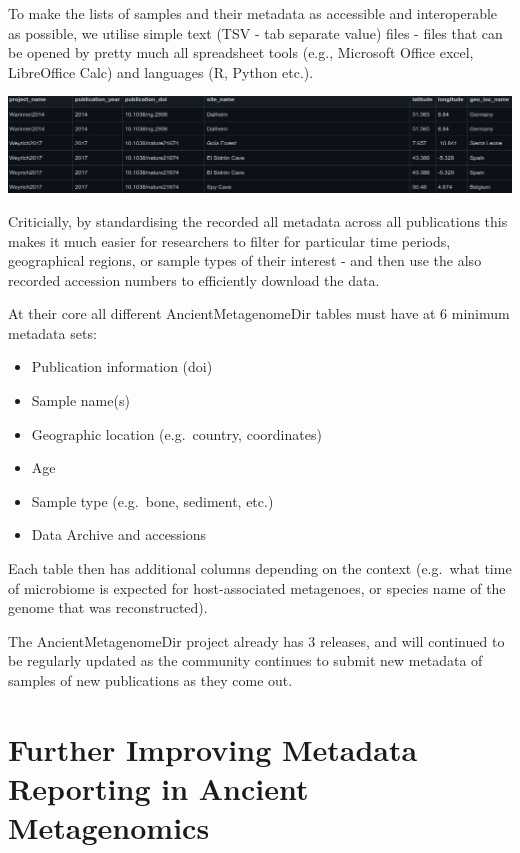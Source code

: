 \documentclass[
  letterpaper,
]{book}
\providecommand{\tightlist}{%
  \setlength{\itemsep}{0pt}\setlength{\parskip}{0pt}}\usepackage{longtable,booktabs,array}
\begin{document}
To make the lists of samples and their metadata as accessible and
interoperable as possible, we utilise simple text (TSV - tab separate
value) files - files that can be opened by pretty much all spreadsheet
tools (e.g., Microsoft Office excel, LibreOffice Calc) and languages (R,
Python etc.).

\includegraphics{assets/images/chapters/introduction-to-ancientmetagenomedir/ancientmetagenomedir-example.png}

Criticially, by standardising the recorded all metadata across all
publications this makes it much easier for researchers to filter for
particular time periods, geographical regions, or sample types of their
interest - and then use the also recorded accession numbers to
efficiently download the data.

At their core all different AncientMetagenomeDir tables must have at 6
minimum metadata sets:

\begin{itemize}
\tightlist
\item
  Publication information (doi)
\item
  Sample name(s)
\item
  Geographic location (e.g.~country, coordinates)
\item
  Age
\item
  Sample type (e.g.~bone, sediment, etc.)
\item
  Data Archive and accessions
\end{itemize}

Each table then has additional columns depending on the context
(e.g.~what time of microbiome is expected for host-associated
metagenoes, or species name of the genome that was reconstructed).

The AncientMetagenomeDir project already has 3 releases, and will
continued to be regularly updated as the community continues to submit
new metadata of samples of new publications as they come out.

\hypertarget{further-improving-metadata-reporting-in-ancient-metagenomics}{%
\section{Further Improving Metadata Reporting in Ancient
Metagenomics}\label{further-improving-metadata-reporting-in-ancient-metagenomics}}
\end{document}
